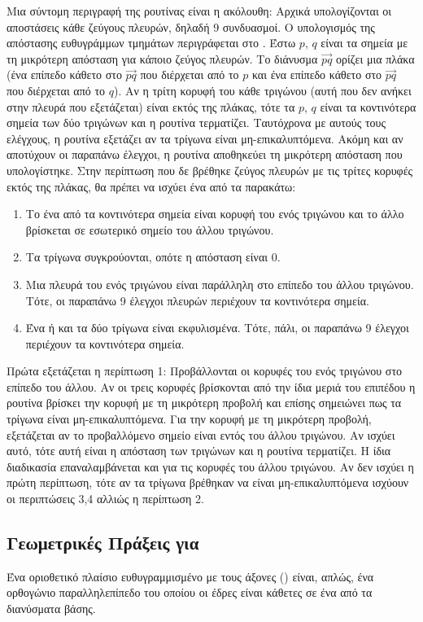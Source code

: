 Μια σύντομη περιγραφή της ρουτίνας είναι η ακόλουθη: 
Αρχικά υπολογίζονται οι αποστάσεις κάθε ζεύγους πλευρών,
δηλαδή 9 συνδυασμοί. 
Ο υπολογισμός της απόστασης ευθυγράμμων τμημάτων 
περιγράφεται στο \cite{lumelsky1985fast}.
Έστω $p$, $q$ είναι τα σημεία με τη μικρότερη απόσταση 
για κάποιο ζεύγος πλευρών.
Το διάνυσμα $\vec{pq}$ ορίζει μια πλάκα (ένα επίπεδο 
κάθετο στο $\vec{pq}$ που διέρχεται από το $p$ και 
ένα επίπεδο κάθετο στο $\vec{pq}$ που διέρχεται
από το $q$).
Αν η τρίτη κορυφή του κάθε τριγώνου (αυτή που δεν ανήκει 
στην πλευρά που εξετάζεται) είναι εκτός της πλάκας, τότε 
τα $p$, $q$ είναι τα κοντινότερα σημεία των δύο τριγώνων
και η ρουτίνα τερματίζει.
Ταυτόχρονα με αυτούς τους ελέγχους, η ρουτίνα εξετάζει 
αν τα τρίγωνα είναι μη-επικαλυπτόμενα.
Ακόμη και αν αποτύχουν οι παραπάνω έλεγχοι, η ρουτίνα 
αποθηκεύει τη μικρότερη απόσταση που υπολογίστηκε.
Στην περίπτωση που δε βρέθηκε ζεύγος πλευρών με τις τρίτες 
κορυφές εκτός της πλάκας, θα πρέπει να ισχύει ένα από τα 
παρακάτω:
\begin{enumerate}
    \item Το ένα από τα κοντινότερα σημεία είναι κορυφή του 
    ενός τριγώνου και το άλλο βρίσκεται σε εσωτερικό σημείο 
    του άλλου τριγώνου.
    \item Τα τρίγωνα συγκρούονται, οπότε η απόσταση είναι 0.
    \item Μια πλευρά του ενός τριγώνου είναι παράλληλη στο 
    επίπεδο του άλλου τριγώνου. 
    Τότε, οι παραπάνω 9 έλεγχοι πλευρών περιέχουν τα κοντινότερα 
    σημεία.
    \item Ένα ή και τα δύο τρίγωνα είναι εκφυλισμένα. 
    Τότε, πάλι, οι παραπάνω 9 έλεγχοι περιέχουν τα κοντινότερα 
    σημεία.
\end{enumerate}

Πρώτα εξετάζεται η περίπτωση 1: 
Προβάλλονται οι κορυφές του ενός τριγώνου στο επίπεδο του 
άλλου. 
Αν οι τρεις κορυφές βρίσκονται από την ίδια μεριά του επιπέδου
η ρουτίνα βρίσκει την κορυφή με τη μικρότερη προβολή και επίσης 
σημειώνει πως τα τρίγωνα είναι μη-επικαλυπτόμενα.
Για την κορυφή με τη μικρότερη προβολή, εξετάζεται αν το προβαλλόμενο
σημείο είναι εντός του άλλου τριγώνου. 
Αν ισχύει αυτό, τότε αυτή είναι η απόσταση των τριγώνων και η 
ρουτίνα τερματίζει.
Η ίδια διαδικασία επαναλαμβάνεται και για τις κορυφές του άλλου τριγώνου.
Αν δεν ισχύει η πρώτη περίπτωση, τότε αν τα τρίγωνα βρέθηκαν να είναι 
μη-επικαλυπτόμενα ισχύουν οι περιπτώσεις 3,4 αλλιώς η περίπτωση 2.

\subsection{Γεωμετρικές Πράξεις για }
Ένα οριοθετικό πλαίσιο ευθυγραμμισμένο με τους άξονες ()
είναι, απλώς, ένα ορθογώνιο παραλληλεπίπεδο του οποίου οι 
έδρες είναι κάθετες σε ένα από τα διανύσματα βάσης.

